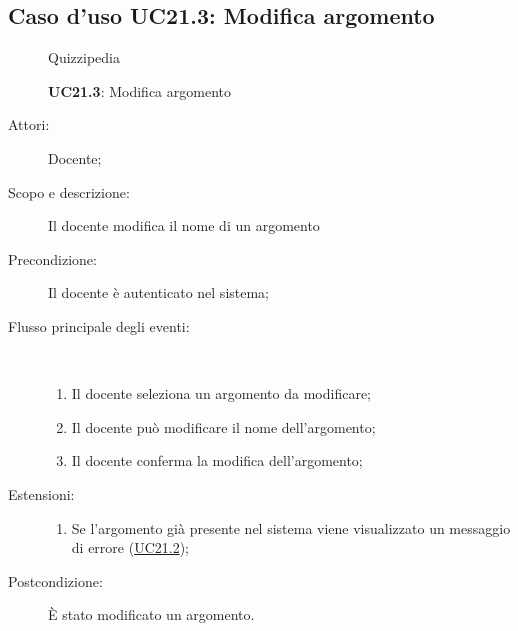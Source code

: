 \subsection{Caso d'uso UC21.3: Modifica argomento}
\begin{figure}[H]
	\centering
	\begin{resizedtikzpicture}{\textwidth}
		\begin{umlsystem}[x=0, fill=lightgray!20]{Quizzipedia}
		\end{umlsystem}
	\end{resizedtikzpicture}
	\caption{\textbf{UC21.3}: Modifica argomento}
	\label{UC21.3}
\end{figure}
\begin{description}
	\item[Attori:] Docente;
	\item[Scopo e descrizione:] Il docente modifica il nome di un argomento
	\item[Precondizione:] Il docente è autenticato nel sistema;
	
	\item[Flusso principale degli eventi:] \ 
	\begin{enumerate}
		\item Il docente seleziona un argomento da modificare;
		\item Il docente può modificare il nome dell'argomento;
		\item Il docente conferma la modifica dell'argomento;
		
	\end{enumerate}
	\item[Estensioni:]
	\begin{enumerate}
		\item Se l'argomento già presente nel sistema viene visualizzato un messaggio di errore (\hyperlink{UC21.2}{UC21.2});
		
	\end{enumerate}
	\item[Postcondizione:] È stato modificato un argomento.
\end{description}
\hypertarget{UC21.4}{}

